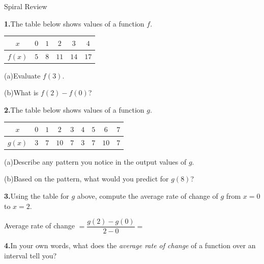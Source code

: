 \documentclass[10pt]{article}
\begin{document}
\namedateperiod

\vspace{0.12in}

\begin{notesbox}{Spiral Review}

\textbf{1.}\quad The table below shows values of a function $f$.

\vspace{4pt}
\begin{center}
\renewcommand{\arraystretch}{1.4}
\begin{tabular}{|c|c|c|c|c|c|}
\hline
$x$ & $0$ & $1$ & $2$ & $3$ & $4$ \\
\hline
$f(x)$ & $5$ & $8$ & $11$ & $14$ & $17$ \\
\hline
\end{tabular}
\end{center}

\vspace{4pt}
(a)\quad Evaluate $f(3)$. \writeline

\vspace{4pt}
(b)\quad What is $f(2) - f(0)$? \writeline

\vspace{0.14in}
\textbf{2.}\quad The table below shows values of a function $g$.

\vspace{4pt}
\begin{center}
\renewcommand{\arraystretch}{1.4}
\begin{tabular}{|c|c|c|c|c|c|c|c|c|}
\hline
$x$ & $0$ & $1$ & $2$ & $3$ & $4$ & $5$ & $6$ & $7$ \\
\hline
$g(x)$ & $3$ & $7$ & $10$ & $7$ & $3$ & $7$ & $10$ & $7$ \\
\hline
\end{tabular}
\end{center}

\vspace{4pt}
(a)\quad Describe any pattern you notice in the output values of $g$.

\vspace{4pt}
(b)\quad Based on the pattern, what would you predict for $g(8)$?
\writeline

\vspace{0.14in}
\textbf{3.}\quad Using the table for $g$ above, compute the average rate of
change of $g$ from $x = 0$ to $x = 2$.

\vspace{4pt}
Average rate of change $= \dfrac{g(2) - g(0)}{2 - 0} = $ \writeline

\vspace{0.14in}
\textbf{4.}\quad In your own words, what does the \emph{average rate of change}
of a function over an interval tell you?

\end{notesbox}
\end{document}
